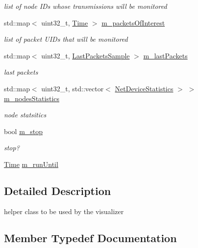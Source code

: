 \begin{DoxyCompactItemize}
\begin{DoxyCompactList}\small\item\em list of node I\+Ds whose transmissions will be monitored \end{DoxyCompactList}\item 
std\+::map$<$ uint32\+\_\+t, \hyperlink{classns3_1_1Time}{Time} $>$ \hyperlink{classns3_1_1PyViz_af922cc7db7145889b2e518e568eac467}{m\+\_\+packets\+Of\+Interest}
\begin{DoxyCompactList}\small\item\em list of packet U\+I\+Ds that will be monitored \end{DoxyCompactList}\item 
std\+::map$<$ uint32\+\_\+t, \hyperlink{structns3_1_1PyViz_1_1LastPacketsSample}{Last\+Packets\+Sample} $>$ \hyperlink{classns3_1_1PyViz_a55366b9119e42eaa283e43b6bc51c464}{m\+\_\+last\+Packets}
\begin{DoxyCompactList}\small\item\em last packets \end{DoxyCompactList}\item 
std\+::map$<$ uint32\+\_\+t, std\+::vector$<$ \hyperlink{structns3_1_1PyViz_1_1NetDeviceStatistics}{Net\+Device\+Statistics} $>$ $>$ \hyperlink{classns3_1_1PyViz_a684bc0c667bc2017904d3a44af8e089e}{m\+\_\+nodes\+Statistics}
\begin{DoxyCompactList}\small\item\em node statsitics \end{DoxyCompactList}\item 
bool \hyperlink{classns3_1_1PyViz_a56fd9349277473f755630786931accc8}{m\+\_\+stop}
\begin{DoxyCompactList}\small\item\em stop? \end{DoxyCompactList}\item 
\hyperlink{classns3_1_1Time}{Time} \hyperlink{classns3_1_1PyViz_af621e6600771eb6a0dec8fcbc6c1e032}{m\+\_\+run\+Until}
\end{DoxyCompactItemize}


\subsection{Detailed Description}
helper class to be used by the visualizer 

\subsection{Member Typedef Documentation}
